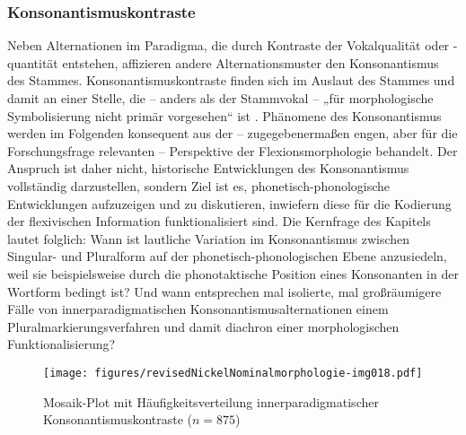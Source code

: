 \subsubsection{Konsonantismuskontraste}\label{sec:7.1.2.3}\largerpage[-1]
Neben Alternationen im Paradigma, die durch Kontraste der Vokalqualität oder -quantität entstehen, affizieren andere Alternationsmuster den Konsonantismus des Stammes. Konsonantismuskontraste finden sich im Auslaut des Stammes und damit an einer Stelle, die -- anders als der Stammvokal -- „für morphologische Symbolisierung nicht primär vorgesehen“ ist \citep[284]{Harnisch1994a}. Phänomene des Konsonantismus werden im Folgenden konsequent aus der -- zugegebenermaßen engen, aber für die Forschungsfrage relevanten -- Perspektive der Flexionsmorphologie behandelt. Der Anspruch ist daher nicht, historische Entwicklungen des Konsonantismus vollständig darzustellen, sondern Ziel ist es, phonetisch-phonologische Entwicklungen aufzuzeigen und zu diskutieren, inwiefern diese für die Kodierung der flexivischen Information funktionalisiert sind. Die Kernfrage des Kapitels lautet folglich: Wann ist lautliche Variation im Konsonantismus zwischen Singular- und Pluralform auf der pho\-ne\-tisch-pho\-no\-lo\-gisch\-en Ebene anzusiedeln, weil sie beispielsweise durch die phonotaktische Position eines Konsonanten in der Wortform bedingt ist? Und wann entsprechen mal isolierte, mal großräumigere Fälle von innerparadigmatischen Konsonantismusalternationen einem Pluralmarkierungsverfahren und damit diachron einer morphologischen Funktionalisierung?


\begin{figure}
\texttt{[image: figures/revisedNickelNominalmorphologie-img018.pdf]}
\caption{Mosaik-Plot mit Häufigkeitsverteilung innerparadigmatischer Konsonantismuskontraste ($n=875$)}
\label{fig:5}
\end{figure}

